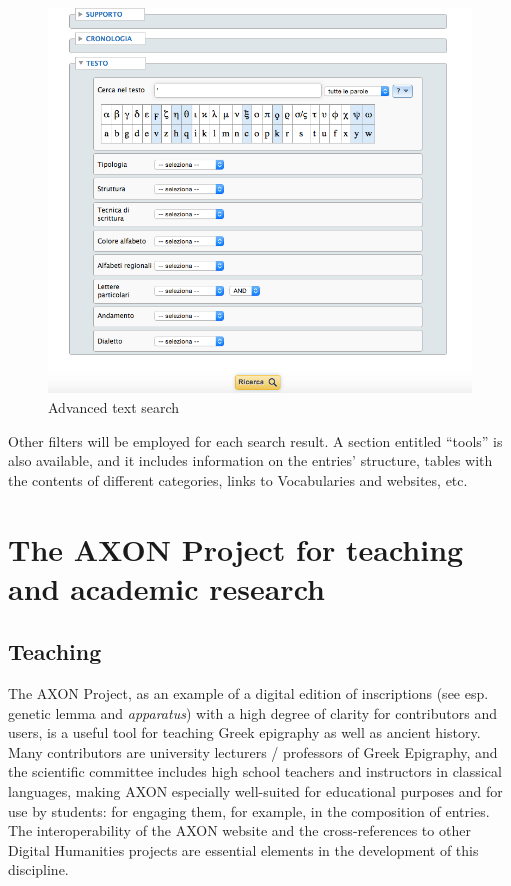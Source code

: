 \documentclass[amsthm,ebook]{saparticle}
\begin{document}
\begin{figure}[!hbp]
\centering
 \includegraphics[width=\columnwidth]{EAGLE2016FullPaperrevised-img005.png}
\caption{Advanced text search}
\label{fig:5}
\end{figure}


Other filters will be employed for each search result. A section entitled ``tools'' is also available, and it
includes information on the entries’ structure, tables with the contents of different categories, links to Vocabularies
and websites, etc. 

\section{The AXON Project for teaching and academic research}




\subsection{Teaching}





\noindent The AXON Project, as an example of a digital edition of inscriptions (see esp. genetic lemma and \emph{apparatus}) with a high
degree of clarity for contributors and users, is a useful tool for teaching Greek epigraphy as well as ancient history.
Many contributors are university lecturers / professors of Greek Epigraphy, and the scientific committee includes high
school teachers and instructors in classical languages, making AXON especially well-suited for educational purposes and
for use by students: for engaging them, for example, in the composition of entries. The interoperability of the AXON
website and the cross-references to other Digital Humanities projects are essential elements in the development of this
discipline. 
\end{document}
